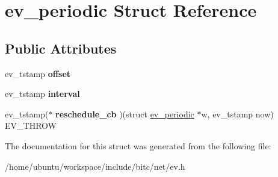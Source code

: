 \hypertarget{structev__periodic}{\section{ev\-\_\-periodic Struct Reference}
\label{structev__periodic}
}
\subsection*{Public Attributes}
\begin{DoxyCompactItemize}
\item 
\hypertarget{structev__periodic_ae7fca8b8ce6fbccc41372d7bf12813e6}{ev\-\_\-tstamp {\bfseries offset}}\label{structev__periodic_ae7fca8b8ce6fbccc41372d7bf12813e6}

\item 
\hypertarget{structev__periodic_a84e353461763d37229b4a7028ed852aa}{ev\-\_\-tstamp {\bfseries interval}}\label{structev__periodic_a84e353461763d37229b4a7028ed852aa}

\item 
\hypertarget{structev__periodic_a7568f25ac430a190e0325f320fa1adc2}{ev\-\_\-tstamp($\ast$ {\bfseries reschedule\-\_\-cb} )(struct \hyperlink{structev__periodic}{ev\-\_\-periodic} $\ast$w, ev\-\_\-tstamp now) E\-V\-\_\-\-T\-H\-R\-O\-W}\label{structev__periodic_a7568f25ac430a190e0325f320fa1adc2}

\end{DoxyCompactItemize}


The documentation for this struct was generated from the following file\-:\begin{DoxyCompactItemize}
\item 
/home/ubuntu/workspace/include/bitc/net/ev.\-h\end{DoxyCompactItemize}
